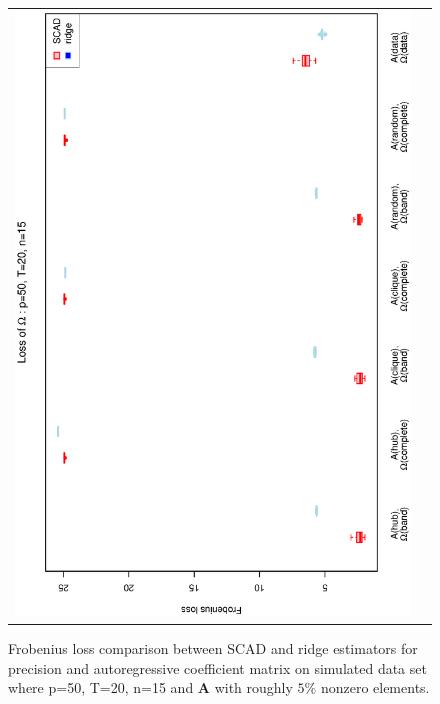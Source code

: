 \begin{figure}[h!]
\begin{tabular}{cc}
\includegraphics[scale=0.45,angle=270]{LossOmega50T20N15_5.eps}
\end{tabular}
\caption{Frobenius loss comparison between SCAD and ridge estimators for precision and autoregressive coefficient matrix on simulated data set where p=50, T=20, n=15  and $\mathbf{A}$ with roughly $5\%$ nonzero elements.}
\label{figSM:Loss50T20N15_5}
\end{figure}
\clearpage


